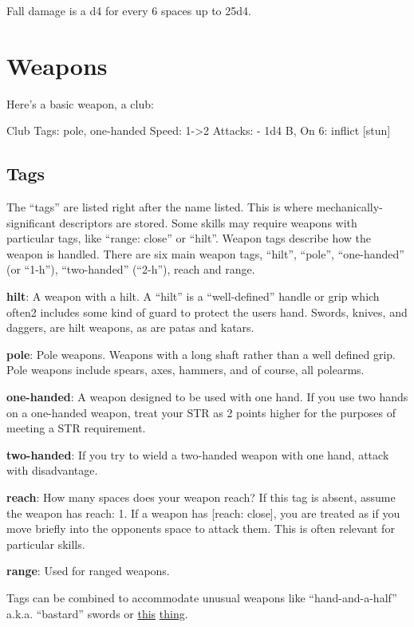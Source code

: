 \documentclass[
  letterpaper,
  DIV=11,
  numbers=noendperiod]{scrartcl}
\begin{document}
Fall damage is a d4 for every 6 spaces up to 25d4.

\section{Weapons}\label{weapons}

Here's a basic weapon, a club:

Club Tags: pole, one-handed Speed: 1-\textgreater2 Attacks: - 1d4 B, On
6: inflict {[}stun{]}

\subsection{Tags}\label{tags}

The ``tags'' are listed right after the name listed. This is where
mechanically-significant descriptors are stored. Some skills may require
weapons with particular tags, like ``range: close'' or ``hilt''. Weapon
tags describe how the weapon is handled. There are six main weapon tags,
``hilt'', ``pole'', ``one-handed'' (or ``1-h''), ``two-handed''
(``2-h''), reach and range.

\textbf{hilt}: A weapon with a hilt. A ``hilt'' is a ``well-defined''
handle or grip which often2 includes some kind of guard to protect the
users hand. Swords, knives, and daggers, are hilt weapons, as are patas
and katars.

\textbf{pole}: Pole weapons. Weapons with a long shaft rather than a
well defined grip. Pole weapons include spears, axes, hammers, and of
course, all polearms.

\textbf{one-handed}: A weapon designed to be used with one hand. If you
use two hands on a one-handed weapon, treat your STR as 2 points higher
for the purposes of meeting a STR requirement.

\textbf{two-handed}: If you try to wield a two-handed weapon with one
hand, attack with disadvantage.

\textbf{reach}: How many spaces does your weapon reach? If this tag is
absent, assume the weapon has reach: 1. If a weapon has {[}reach:
close{]}, you are treated as if you move briefly into the opponents
space to attack them. This is often relevant for particular skills.

\textbf{range}: Used for ranged weapons.

Tags can be combined to accommodate unusual weapons like
``hand-and-a-half'' a.k.a. ``bastard'' swords or
\href{https://www.youtube.com/watch?v=rHWGp5lGUNY}{this}
\href{https://swordsantiqueweapons.com/s1866_full.html}{thing}.
\end{document}
